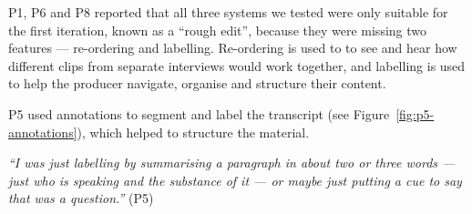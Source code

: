 



P1, P6 and P8 reported that all three systems we tested were only suitable for the first iteration, known as a ``rough
edit'', because they were missing two features --- re-ordering and labelling. Re-ordering is used to to see and hear how
different clips from separate interviews would work together, and labelling is used to help the producer navigate,
organise and structure their content. 




P5 used annotations to segment and label the transcript (see Figure~\ref{fig:p5-annotations}), which helped to
structure the material.

\textit{``I was just labelling by summarising a paragraph in about two or three words --- just who is speaking and the
substance of it --- or maybe just putting a cue to say that was a question.''} (P5) 

